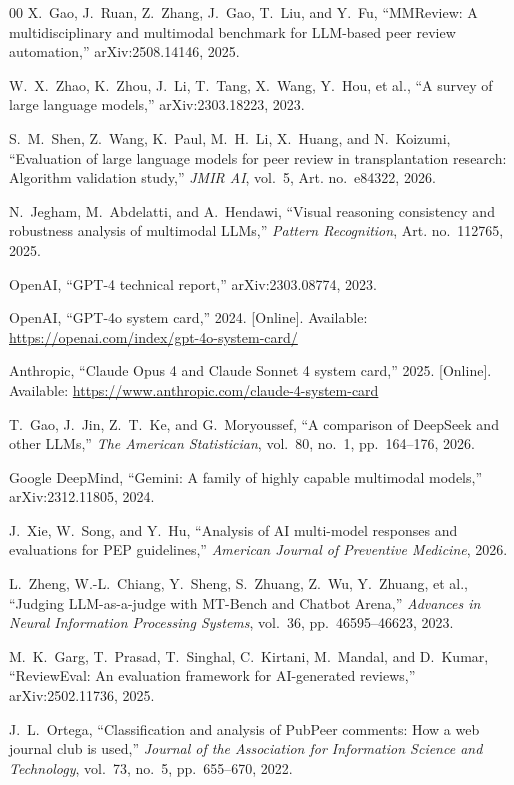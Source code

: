 \documentclass[preprint,10pt,times]{elsarticle}
\begin{document}
\begin{thebibliography}{00}
X.~Gao, J.~Ruan, Z.~Zhang, J.~Gao, T.~Liu, and Y.~Fu,
``MMReview: A multidisciplinary and multimodal benchmark for LLM-based peer review automation,''
arXiv:2508.14146, 2025.

W.~X.~Zhao, K.~Zhou, J.~Li, T.~Tang, X.~Wang, Y.~Hou, et al.,
``A survey of large language models,''
arXiv:2303.18223, 2023.

S.~M.~Shen, Z.~Wang, K.~Paul, M.~H.~Li, X.~Huang, and N.~Koizumi,
``Evaluation of large language models for peer review in transplantation research: Algorithm validation study,''
\textit{JMIR AI}, vol.~5, Art. no.~e84322, 2026.

N.~Jegham, M.~Abdelatti, and A.~Hendawi,
``Visual reasoning consistency and robustness analysis of multimodal LLMs,''
\textit{Pattern Recognition}, Art. no.~112765, 2025.

OpenAI,
``GPT-4 technical report,''
arXiv:2303.08774, 2023.

OpenAI,
``GPT-4o system card,'' 2024. [Online]. Available: \url{https://openai.com/index/gpt-4o-system-card/}

Anthropic,
``Claude Opus 4 and Claude Sonnet 4 system card,'' 2025. [Online]. Available: \url{https://www.anthropic.com/claude-4-system-card}

T.~Gao, J.~Jin, Z.~T.~Ke, and G.~Moryoussef,
``A comparison of DeepSeek and other LLMs,''
\textit{The American Statistician}, vol.~80, no.~1, pp.~164--176, 2026.

Google DeepMind,
``Gemini: A family of highly capable multimodal models,''
arXiv:2312.11805, 2024.

J.~Xie, W.~Song, and Y.~Hu,
``Analysis of AI multi-model responses and evaluations for PEP guidelines,''
\textit{American Journal of Preventive Medicine}, 2026.

L.~Zheng, W.-L.~Chiang, Y.~Sheng, S.~Zhuang, Z.~Wu, Y.~Zhuang, et al.,
``Judging LLM-as-a-judge with MT-Bench and Chatbot Arena,''
\textit{Advances in Neural Information Processing Systems}, vol.~36, pp.~46595--46623, 2023.

M.~K.~Garg, T.~Prasad, T.~Singhal, C.~Kirtani, M.~Mandal, and D.~Kumar,
``ReviewEval: An evaluation framework for AI-generated reviews,''
arXiv:2502.11736, 2025.

J.~L.~Ortega,
``Classification and analysis of PubPeer comments: How a web journal club is used,''
\textit{Journal of the Association for Information Science and Technology}, vol.~73, no.~5, pp.~655--670, 2022.


\end{thebibliography}
\end{document}
